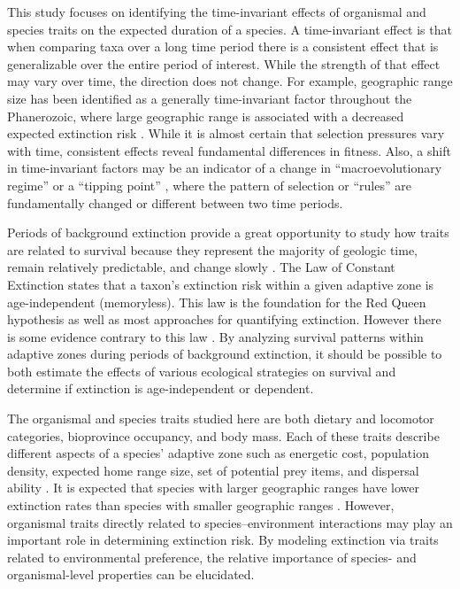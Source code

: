 \documentclass{nature}
\begin{document}
This study focuses on identifying the time-invariant effects of organismal and species traits on the expected duration of a species. A time-invariant effect is that when comparing taxa over a long time period there is a consistent effect that is generalizable over the entire period of interest. While the strength of that effect may vary over time, the direction does not change. For example, geographic range size has been identified as a generally time-invariant factor throughout the Phanerozoic, where large geographic range is associated with a decreased expected extinction risk \cite{Payne2007}. While it is almost certain that selection pressures vary with time, consistent effects reveal fundamental differences in fitness. Also, a shift in time-invariant factors may be an indicator of a change in ``macroevolutionary regime'' \cite{Jablonski1986} or a ``tipping point'' \cite{Barnosky2012a,Barnosky2011}, where the pattern of selection or ``rules'' are fundamentally changed or different between two time periods.

Periods of background extinction provide a great opportunity to study how traits are related to survival because they represent the majority of geologic time, remain relatively predictable, and change slowly \cite{Jablonski1986,Raup1988}. The Law of Constant Extinction \cite{VanValen1973} states that a taxon's extinction risk within a given adaptive zone is age-independent (memoryless). This law is the foundation for the Red Queen hypothesis as well as most approaches for quantifying extinction. However there is some evidence contrary to this law \cite{Finnegan2008}. By analyzing survival patterns within adaptive zones during periods of background extinction, it should be possible to both estimate the effects of various ecological strategies on survival and determine if extinction is age-independent or dependent. 

The organismal and species traits studied here are both dietary and locomotor categories, bioprovince occupancy, and body mass. Each of these traits describe different aspects of a species' adaptive zone such as energetic cost, population density, expected home range size, set of potential prey items, and dispersal ability \cite{Smith2004,Jernvall2004,Lyons2010}. It is expected that species with larger geographic ranges have lower extinction rates than species with smaller geographic ranges \cite{Jablonski1986,Harnik2013,Roy2009c}. However, organismal traits directly related to species--environment interactions may play an important role in determining extinction risk. By modeling extinction via traits related to environmental preference, the relative importance of species- and organismal-level properties can be elucidated. 
\end{document}
